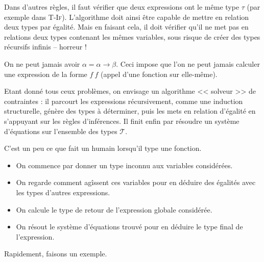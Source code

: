 \documentclass[11pt]{article}
\begin{document}
\begin{itemize}
    Dans d'autres règles, il faut vérifier que deux expressions ont le même type $\tau$ (par exemple dans {\scshape{T-If}}). L'algorithme doit ainsi être capable de mettre en relation deux types par égalité. Mais en faisant cela, il doit vérifier qu'il ne met pas en relations deux types contenant les mêmes variables, sous risque de créer des types récursifs infinis -- horreur !

    \begin{example}
        On ne peut jamais avoir $\alpha=\alpha\to\beta$. Ceci impose que l'on ne peut jamais calculer une expression de la forme $f~f$ (appel d'une fonction sur elle-même).
    \end{example}
\end{itemize}

Etant donné tous ceux problèmes, on envisage un algorithme << solveur >> de contraintes : il parcourt les expressions récursivement, comme une induction structurelle, génère des types à déterminer, puis les mets en relation d'égalité en s'appuyant sur les règles d'inférences. Il finit enfin par résoudre un système d'équations sur l'ensemble des types $\mathcal{T}$.

C'est un peu ce que fait un humain lorsqu'il type une fonction.
\begin{itemize}
    \item On commence par donner un type inconnu aux variables considérées.
    \item On regarde comment agîssent ces variables pour en déduire des égalités avec les types d'autres expressions.
    \item On calcule le type de retour de l'expression globale considérée.
    \item On résout le système d'équations trouvé pour en déduire le type final de l'expression.
\end{itemize}

Rapidement, faisons un exemple.
\end{document}
